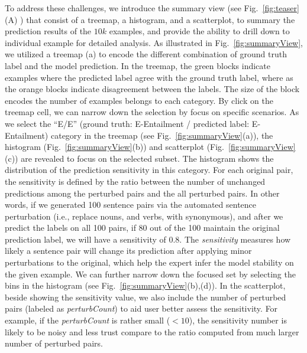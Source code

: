 To address these challenges, we introduce the summary view (see Fig.~\ref{fig:teaser}(A) ) that consist of a treemap, a histogram, and a scatterplot, to summary the prediction results of the $10k$ examples, and provide the ability to drill down to individual example for detailed analysis.
As illustrated in Fig.~\ref{fig:summaryView}, we utilized a treemap (a) to encode the different combination of ground truth label and the model prediction. In the treemap, the green blocks indicate examples where the predicted label agree with the ground truth label, where as the orange blocks indicate disagreement between the labels. The size of the block encodes the number of examples belongs to each category.
%
By click on the treemap cell, we can narrow down the selection by focus on specific scenarios.
%
As we select the ``E/E'' (ground truth: E-Entailment / predicted label: E-Entailment) category in the treemap (see Fig.~\ref{fig:summaryView}(a)), the histogram (Fig.~\ref{fig:summaryView}(b)) and scatterplot  (Fig.~\ref{fig:summaryView}(c)) are revealed to focus on the selected subset. The histogram shows the distribution of the prediction sensitivity in this category. For each original pair, the sensitivity is defined by the ratio between the number of unchanged predictions among the perturbed pairs and the all perturbed pairs. In other words, if we generated 100 sentence pairs via the automated sentence perturbation (i.e., replace nouns, and verbs, with synonymous), and after we predict the labels on all 100 pairs, if 80 out of the 100 maintain the original prediction label, we will have a sensitivity of 0.8. The \emph{sensitivity} measures how likely a sentence pair will change its prediction after applying minor perturbations to the original, which help the expert infer the model stability on the given example.
%
We can further narrow down the focused set by selecting the bins in the histogram (see Fig.~\ref{fig:summaryView}(b),(d)). 
%
In the scatterplot, beside showing the sensitivity value, we also include the number of perturbed pairs (labeled as \emph{perturbCount}) to aid user better assess the sensitivity. For example, if the \emph{perturbCount} is rather small ($<10$), the sensitivity number is likely to be noisy and less trust compare to the ratio computed from much larger number of perturbed pairs.

